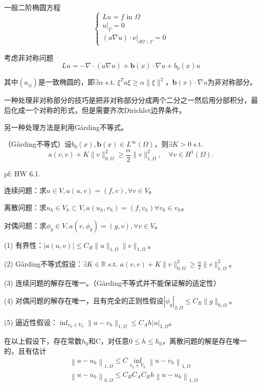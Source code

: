 一般二阶椭圆方程
\[
  \left\{\begin{array}{l}
    Lu=f \text { in } \Omega \\
    u|_{\Gamma}=0 \\
    (a \nabla u) \cdot \nu|_{\partial \Omega \backslash \Gamma}=0
  \end{array}\right.
\]

考虑非对称问题
\[
  Lu = -\nabla \cdot(a \nabla u)+\mathbf{b}(x) \cdot \nabla u+b_{0}(x) u
\]

其中$(a_{ij})$是一致椭圆的，即$\exists \alpha$ s.t. $\xi^T a \xi \ge \alpha \|\xi\|^2$，$\mathbf{b}(x) \cdot \nabla u$为非对称部分。

一种处理非对称部分的技巧是把非对称部分分成两个二分之一然后用分部积分，最后化成一个对称的形式，但是需要齐次Dirichlet边界条件。

另一种处理方法是利用Gårding不等式。

\begin{thm}
  （Gårding不等式）设$b_{0}(x), \mathbf{b}(x) \in L^{\infty}(\Omega)$，则$\exists K>0$ s.t.
  \[
    a(v, v)+K\|v\|_{0, \Omega}^{2} \geq \frac{\alpha}{2}\|v\|_{1, \Omega}^2, \quad \forall v \in H^{1}(\Omega) .
  \]
\end{thm}

pf: HW 6.1.

连续问题：求$u \in V, a(u, v)=(f, v), \forall v \in V$。

离散问题：求$u_{h} \in V_{h} \subset V, a\left(u_{h}, v_{h}\right)=\left(f, v_{h}\right) \forall v_{h} \in v_{h}$。

对偶问题：求$\phi_g \in V, a(v, \phi_g)=(g, v), \forall v \in V$。

(1) 有界性：$|a(u, v)| \le C_B\|u\|_{1, \Omega}\|v\|_{1, \Omega}$。

(2) Gårding不等式假设：$\exists K \in \mathbb{R}$ s.t. $a(v, v)+K\|v\|_{0, \Omega}^{2} \geq \frac{\alpha}{2}\|v\|_{1, \Omega}^{2}$。

(3) 连续问题的解存在唯一。（Gårding不等式并不能保证解的适定性）

(4) 对偶问题的解存在唯一，且有完全的正则性假设$|\phi_g|_{2, \Omega} \le C_{R}\|g\|_{0, \Omega}$。

(5) 逼近性假设：$\inf _{v_h \in V_{h}}\|u-v_h\|_{1, \Omega} \le C_{A} h|u|_{2, \Omega}$。

\begin{thm}
  在以上假设下，存在常数$h_{0}$和C，对任意$0 \le h \le h_{0}$，离散问题的解是存在唯一的，且有估计
  \[
    \begin{aligned}
      &\left\|u-u_{h}\right\|_{1, \Omega} \le C \inf _{v_{h} \in V_{h}}\left\|u-v_{h}\right\|_{1, \Omega} \\
      &\left\|u-u_{h}\right\|_{0, \Omega} \le C_B C_{A} C_{R} h\left\|u-u_{h}\right\|_{1, \Omega}
    \end{aligned}
  \]
\end{thm}

